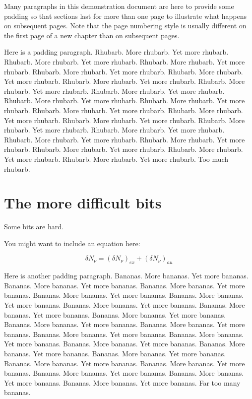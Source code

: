 \documentclass[12pt,a4paper]{report}
\begin{document}
Many paragraphs in this demonstration document are here to provide some
padding so that sections last for more than one page to illustrate what
happens on subsequent pages. Note that the page numbering style is usually
different on the first page of a new chapter than on subsequent pages.

Here is a padding paragraph.  Rhubarb.  More rhubarb.  Yet more rhubarb. 
Rhubarb.  More rhubarb.  Yet more rhubarb.  Rhubarb.  More rhubarb.  Yet
more rhubarb.  Rhubarb.  More rhubarb.  Yet more rhubarb.  Rhubarb. 
More rhubarb.  Yet more rhubarb.  Rhubarb.  More rhubarb.  Yet more
rhubarb.  Rhubarb.  More rhubarb.  Yet more rhubarb.  Rhubarb.  More
rhubarb.  Yet more rhubarb.  Rhubarb.  More rhubarb.  Yet more rhubarb. 
Rhubarb.  More rhubarb.  Yet more rhubarb.  Rhubarb.  More rhubarb.  Yet
more rhubarb.  Rhubarb.  More rhubarb.  Yet more rhubarb.  Rhubarb. 
More rhubarb.  Yet more rhubarb.  Rhubarb.  More rhubarb.  Yet more
rhubarb.  Rhubarb.  More rhubarb.  Yet more rhubarb.   Rhubarb.  More
rhubarb.  Yet more rhubarb.   Rhubarb.  More rhubarb.  Yet more
rhubarb.  Rhubarb.  More rhubarb.  Yet more rhubarb.    Rhubarb.  More
rhubarb.  Yet more rhubarb.  Rhubarb.  More rhubarb.  Yet more rhubarb. 
Too much rhubarb.

\section{The more difficult bits}
Some bits are hard.

You might want to include an equation here:

\begin{equation}
  \delta N_{\nu} = (\delta N_{\nu})_{ex} + (\delta N_{\nu})_{au} 
  \label{equation:delsplit}
\end{equation}


Here is another padding paragraph.  Bananas.  More bananas.  Yet more
bananas.  Bananas.  More bananas.  Yet more bananas.  Bananas.  More
bananas.  Yet more bananas.  Bananas.  More bananas.  Yet more
bananas.  Bananas.  More bananas.  Yet more bananas.  Bananas.  More
bananas.  Yet more bananas.  Bananas.  More bananas.  Yet more
bananas.  Bananas.  More bananas.  Yet more bananas.  Bananas.  More
bananas.  Yet more bananas.  Bananas.  More bananas.  Yet more
bananas.  Bananas.  More bananas.  Yet more bananas.  Bananas.  More
bananas.  Yet more bananas.  Bananas.  More bananas.  Yet more
bananas.  Bananas.  More bananas.  Yet more bananas.  Bananas.  More
bananas.  Yet more bananas.  Bananas.  More bananas.  Yet more
bananas.  Bananas.  More bananas.  Yet more bananas.  Bananas.  More
bananas.  Yet more bananas.  Bananas.  More bananas.  Yet more
bananas.  Bananas.  More bananas.  Yet more bananas.  Far too many
bananas.
\end{document}
